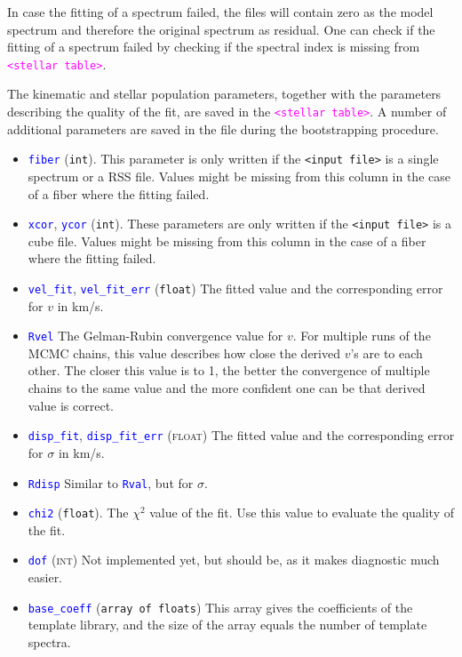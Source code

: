 \documentclass[usenatbib,usegraphicx,useAMS,onecolumn]{mn2e}
\newcommand{\codeline}[1]{\lstinline|#1|}
\newcommand{\tblcol}[1]{\textcolor{blue}{\codeline{#1}}}
\newcommand{\fname}[1]{\textcolor{magenta}{\codeline{#1}}}
\begin{document}
In case the fitting of a spectrum failed, the files will contain zero as the model spectrum and therefore the original spectrum as residual.
One can check if the fitting of a spectrum failed by checking if the spectral index is missing from \fname{<stellar table>}.

The kinematic and stellar population parameters, together with the parameters describing the quality of the fit, are saved in the \fname{<stellar table>}.
A number of additional parameters are saved in the file during the bootstrapping procedure.
\begin{itemize}
    \item \tblcol{fiber} (\texttt{int}).
        This parameter is only written if the \texttt{<input file>} is a single spectrum or a RSS file.
        Values might be missing from this column in the case of a fiber where the fitting failed.
    \item \tblcol{xcor}, \tblcol{ycor} (\texttt{int}).
        These parameters are only written if the \texttt{<input file>} is a cube file.
        Values might be missing from this column in the case of a fiber where the fitting failed.
    \item \tblcol{vel_fit}, \tblcol{vel_fit_err} (\texttt{float})
        The fitted value and the corresponding error for $v$ in km/s.
    \item \tblcol{Rvel}
        The Gelman-Rubin convergence value for $v$.
        For multiple runs of the MCMC chains, this value describes how close the derived $v$'s are to each other.
        The closer this value is to 1, the better the convergence of multiple chains to the same value and the more confident one can be that derived value is correct.
    \item \tblcol{disp_fit}, \tblcol{disp_fit_err} (\textsc{float})
        The fitted value and the corresponding error for $\sigma$ in km/s.
    \item \tblcol{Rdisp}
        Similar to \tblcol{Rval}, but for $\sigma$.
    \item \tblcol{chi2} (\texttt{float}).
        The $\chi^2$ value of the fit.
        Use this value to evaluate the quality of the fit.
    \item \tblcol{dof} (\textsc{int})
        Not implemented yet, but should be, as it makes diagnostic much easier.
    \item \tblcol{base_coeff} (\texttt{array of floats})
        This array gives the coefficients of the template library, and the size of the array equals the number of template spectra.

\end{itemize}
\end{document}
